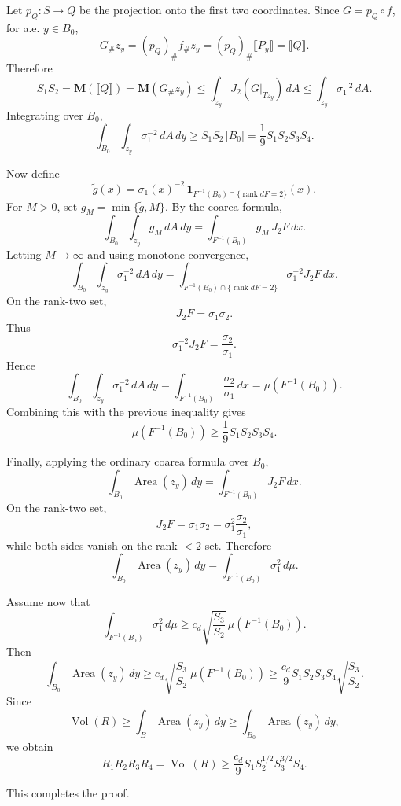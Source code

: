 \documentclass[12pt]{article}
\begin{document}
Let \(p_Q:S\to Q\) be the projection onto the first two coordinates. Since \(G=p_Q\circ f\), for a.e. \(y\in B_0\),
\[
G_\#z_y
=
(p_Q)_\# f_\#z_y
=
(p_Q)_\#\llbracket P_y\rrbracket
=
\llbracket Q\rrbracket.
\]
Therefore
\[
S_1S_2
=
\mathbf M(\llbracket Q\rrbracket)
=
\mathbf M(G_\#z_y)
\le
\int_{z_y}J_2(G|_{Tz_y})\,dA
\le
\int_{z_y}\sigma_1^{-2}\,dA.
\]
Integrating over \(B_0\),
\[
\int_{B_0}\int_{z_y}\sigma_1^{-2}\,dA\,dy
\ge
S_1S_2\,|B_0|
=
\frac19 S_1S_2S_3S_4.
\]

Now define
\[
\widetilde g(x)
=
\sigma_1(x)^{-2}\,
\mathbf 1_{F^{-1}(B_0)\cap\{\operatorname{rank}dF=2\}}(x).
\]
For \(M>0\), set \(g_M=\min\{\widetilde g,M\}\). By the coarea formula,
\[
\int_{B_0}\int_{z_y} g_M\,dA\,dy
=
\int_{F^{-1}(B_0)}g_M\,J_2F\,dx.
\]
Letting \(M\to\infty\) and using monotone convergence,
\[
\int_{B_0}\int_{z_y}\sigma_1^{-2}\,dA\,dy
=
\int_{F^{-1}(B_0)\cap\{\operatorname{rank}dF=2\}}
\sigma_1^{-2}J_2F\,dx.
\]
On the rank-two set,
\[
J_2F=\sigma_1\sigma_2.
\]
Thus
\[
\sigma_1^{-2}J_2F
=
\frac{\sigma_2}{\sigma_1}.
\]
Hence
\[
\int_{B_0}\int_{z_y}\sigma_1^{-2}\,dA\,dy
=
\int_{F^{-1}(B_0)}\frac{\sigma_2}{\sigma_1}\,dx
=
\mu(F^{-1}(B_0)).
\]
Combining this with the previous inequality gives
\[
\mu(F^{-1}(B_0))
\ge
\frac19 S_1S_2S_3S_4.
\]

Finally, applying the ordinary coarea formula over \(B_0\),
\[
\int_{B_0}\operatorname{Area}(z_y)\,dy
=
\int_{F^{-1}(B_0)}J_2F\,dx.
\]
On the rank-two set,
\[
J_2F=\sigma_1\sigma_2
=
\sigma_1^2\frac{\sigma_2}{\sigma_1},
\]
while both sides vanish on the rank \(<2\) set. Therefore
\[
\int_{B_0}\operatorname{Area}(z_y)\,dy
=
\int_{F^{-1}(B_0)}\sigma_1^2\,d\mu.
\]

Assume now that
\[
\int_{F^{-1}(B_0)}\sigma_1^2\,d\mu
\ge
c_d\sqrt{\frac{S_3}{S_2}}\,
\mu(F^{-1}(B_0)).
\]
Then
\[
\int_{B_0}\operatorname{Area}(z_y)\,dy
\ge
c_d\sqrt{\frac{S_3}{S_2}}\,
\mu(F^{-1}(B_0))
\ge
\frac{c_d}{9}
S_1S_2S_3S_4
\sqrt{\frac{S_3}{S_2}}.
\]
Since
\[
\operatorname{Vol}(R)
\ge
\int_B\operatorname{Area}(z_y)\,dy
\ge
\int_{B_0}\operatorname{Area}(z_y)\,dy,
\]
we obtain
\[
R_1R_2R_3R_4
=
\operatorname{Vol}(R)
\ge
\frac{c_d}{9}
S_1S_2^{1/2}S_3^{3/2}S_4.
\]

This completes the proof.
\end{document}
